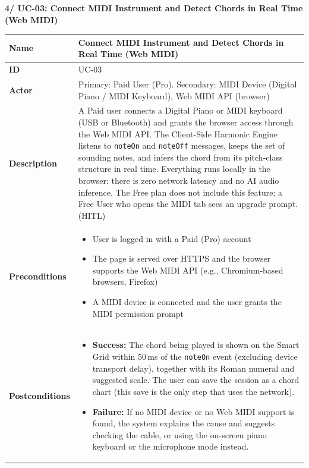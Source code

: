 \documentclass[a4paper]{article}
\newlength{\ucLeft}
\begin{document}
\vspace{0.5em}
\noindent\textbf{4/ UC-03: Connect MIDI Instrument and Detect Chords in Real Time (Web MIDI)}

\begin{longtable}{|>{\bfseries}p{\ucLeft}|p{\dimexpr\linewidth-\ucLeft-2\tabcolsep-2\arrayrulewidth}|}
\hline
Name & Connect MIDI Instrument and Detect Chords in Real Time (Web MIDI) \\ \hline
ID & UC-03 \\ \hline
Actor & Primary: Paid User (Pro). Secondary: MIDI Device (Digital Piano / MIDI Keyboard), Web MIDI API (browser) \\ \hline
Description & A Paid user connects a Digital Piano or MIDI keyboard (USB or Bluetooth) and grants the browser access through the Web MIDI API. The Client-Side Harmonic Engine listens to \texttt{noteOn} and \texttt{noteOff} messages, keeps the set of sounding notes, and infers the chord from its pitch-class structure in real time. Everything runs locally in the browser: there is zero network latency and no AI audio inference. The Free plan does not include this feature; a Free User who opens the MIDI tab sees an upgrade prompt. (HITL) \\ \hline
Preconditions &
\begin{itemize}[leftmargin=1em, nosep, topsep=2pt, partopsep=0pt, parsep=0pt, after=\strut]
    \item User is logged in with a Paid (Pro) account
    \item The page is served over HTTPS and the browser supports the Web MIDI API (e.g., Chromium-based browsers, Firefox)
    \item A MIDI device is connected and the user grants the MIDI permission prompt
\end{itemize}
\\ \hline
Postconditions &
\begin{itemize}[leftmargin=1em, nosep, topsep=2pt, partopsep=0pt, parsep=0pt, after=\strut]
    \item \textbf{Success:} The chord being played is shown on the Smart Grid within 50\,ms of the \texttt{noteOn} event (excluding device transport delay), together with its Roman numeral and suggested scale. The user can save the session as a chord chart (this save is the only step that uses the network).
    \item \textbf{Failure:} If no MIDI device or no Web MIDI support is found, the system explains the cause and suggests checking the cable, or using the on-screen piano keyboard or the microphone mode instead.

\end{itemize}
\end{longtable}
\end{document}
